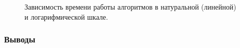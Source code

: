 \documentclass[12pt]{article}
\begin{document}
\begin{figure}[h]
	\begin{minipage}[h]{0.49\linewidth}
	\end{minipage}
	\hfill
	\begin{minipage}[h]{0.49\linewidth}
	\end{minipage}
	\caption{Зависимость времени работы алгоритмов в натуральной (линейной) и логарифмической шкале.}
\end{figure}

\subsubsection*{Выводы}
\end{document}
